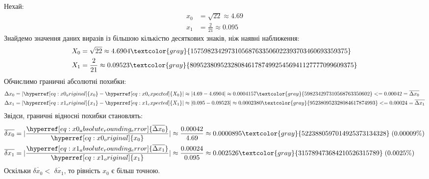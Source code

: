 Нехай:
\begin{align}
    x_0 & =
    \sqrt{22}
    \approx 4.69
    \label{eq:x0_original} \\
    x_1 & =
    \frac{2}{21}
    \approx 0.095
    \label{eq:x1_original}
\end{align}
Знайдемо значення даних виразів із більшою кількістю
десяткових знаків, ніж наявні наближення:
\begin{align}
    X_0 & =
    \sqrt{22}
    \approx 4.6904
    \textcolor{gray}{1575982342973105687633506022393703460693359375}
    \label{eq:x0_expected} \\
    X_1 & =
    \frac{2}{21}
    \approx 0.09523
    \textcolor{gray}{809523809523280846178749925456941127777099609375}
    \label{eq:x1_expected}
\end{align}
Обчислимо граничні абсолютні похибки:
\begin{align}
    \Delta x_0 & =
    |\hyperref[eq:x0_original]{x_0} - \hyperref[eq:x0_expected]{X_0}|
    \approx |4.69 - 4.6904|
    \approx 0.0004157
    \textcolor{gray}{598234297310568763350602}
    <= 0.00042 = \overline{\Delta x_0}
    \label{eq:x0_absolute_rounding_error} \\
    \Delta x_1 & =
    |\hyperref[eq:x1_original]{x_1} - \hyperref[eq:x1_expected]{X_1}|
    \approx |0.095 - 0.09523|
    \approx 0.0002380
    \textcolor{gray}{952380952328084617874993}
    <= 0.00024 = \overline{\Delta x_1}
    \label{eq:x1_absolute_rounding_error}
\end{align}
Звідси, граничні відносні похибки становлять:
\begin{align}
    \overline{\delta x_0} & =
    |\frac{
        \hyperref[eq:x0_absolute_rounding_error]{\overline{\Delta x_0}}
    }{
        \hyperref[eq:x0_original]{x_0}
    }|
    \approx \frac{0.00042}{4.69}
    \approx 0.0000895
    \textcolor{gray}{5223880597014925373134328}
    \; (0.00009\%)
    \label{eq:x0_relative_rounding_error} \\
    \overline{\delta x_1} & =
    |\frac{
        \hyperref[eq:x1_absolute_rounding_error]{\overline{\Delta x_1}}
    }{
        \hyperref[eq:x1_original]{x_1}
    }|
    \approx \frac{0.00024}{0.095}
    \approx 0.002526
    \textcolor{gray}{315789473684210526315789}
    \; (0.0025\%)
    \label{eq:x1_relative_rounding_error}
\end{align}
Оскільки
$\hyperref[eq:x0_relative_rounding_error]{\overline{\delta x_0}} <$
$\hyperref[eq:x1_relative_rounding_error]{\overline{\delta x_1}}$, то рівність
$\hyperref[eq:x0_original]{x_0}$ є більш точною.
